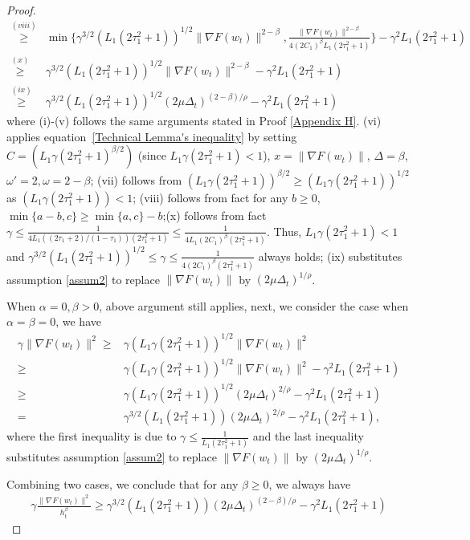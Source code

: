 \documentclass[10pt]{article} %
\def\eqref#1{equation~\ref{#1}}
\newtheorem{proof}{Proof}
\begin{document}
\begin{proof}
\begin{align}
    \overset{(viii)}{\geq}& \min\{\gamma^{{3}/{2}} (L_1(2\tau_1^2+1))^{1/2}\|\nabla F(w_t) \|^{2-\beta},\frac{\big \|\nabla F(w_t) \big \|^{2-\beta}}{4(2C_1)^{\beta} L_1(2\tau_1^2+1)}\}-\gamma^2L_1(2\tau_1^2+1)\nonumber \\
    \overset{(x)}{\geq}&\gamma^{{3}/{2}} (L_1(2\tau_1^2+1))^{1/2}\|\nabla F(w_t) \|^{2-\beta}-\gamma^2L_1(2\tau_1^2+1)
    \nonumber\\
    \overset{(ix)}{\geq}&\gamma^{{3}/{2}} (L_1(2\tau_1^2+1))^{1/2}(2\mu \Delta_t)^{(2-\beta)/\rho}-\gamma^2L_1(2\tau_1^2+1)
\end{align}
where (i)-(v) follows the same arguments stated in Proof \ref{Appendix H}. (vi) applies \eqref{Technical Lemma's inequality} by setting $C=(L_1\gamma(2\tau_1^2+1)^{\beta/2})$ (since $L_1\gamma(2\tau_1^2+1)<1$), $x=\|\nabla F(w_t) \|$, $\Delta=\beta$, $\omega' = 2,\omega = 2-\beta$; (vii) follows from $(L_1\gamma(2\tau_1^2+1))^{\beta/2}\geq (L_1\gamma(2\tau_1^2+1))^{1/2}$ as $(L_1\gamma(2\tau_1^2+1))<1$; (viii) follows from fact for any $b\geq 0$, $\min \{a-b,c\}\geq \min\{a,c\}-b$;(x) follows from fact $\gamma \leq \frac{1}{4L_1((2\tau_1+2)/(1-\tau_1))(2\tau_1^2+1)}\leq \frac{1}{4L_1(2C_1)^{\beta}(2\tau_1^2+1)}$. Thus, $L_1\gamma(2\tau_1^2+1)<1$ and $\gamma^{3/2}(L_1(2\tau_1^2+1))^{1/2}\leq \gamma\leq  \frac{1}{4(2C_1)^{\beta}(2\tau_1^2+1)}$ always holds; (ix) substitutes assumption \ref{assum2} to replace $\|\nabla F(w_t) \|$ by $(2\mu\Delta_t)^{1/\rho}$.

When $\alpha=0,\beta>0$, above argument still applies, next, we consider the case when $\alpha=\beta=0$, we have
\begin{align}
    \gamma \|\nabla F(w_t) \|^2\geq& \gamma(L_1\gamma(2\tau_1^2+1))^{1/2} \|\nabla F(w_t) \|^2 \nonumber\\
    \geq & \gamma (L_1\gamma(2\tau_1^2+1))^{1/2}\|\nabla F(w_t) \|^2 - \gamma^2 L_1(2\tau_1^2+1)\nonumber \\
    \geq &\gamma (L_1\gamma(2\tau_1^2+1))^{1/2}(2\mu\Delta_t)^{2/\rho} - \gamma^2 L_1(2\tau_1^2+1)\nonumber\\
    = & \gamma^{3/2}(L_1(2\tau_1^2+1))(2\mu\Delta_t)^{2/\rho}-\gamma^2 L_1(2\tau_1^2+1),
\end{align}
where the first inequality is due to $\gamma\leq \frac{1}{L_1(2\tau_1^2+1)}$ and the last inequality substitutes assumption \ref{assum2} to replace $\|\nabla F(w_t) \|$ by $(2\mu\Delta_t)^{1/\rho}$.

Combining two cases, we conclude that for any $\beta\geq 0$, we always have
\begin{align}
    \gamma\frac{ \big \| \nabla F(w_t) \big \|^2}{h_t^{\beta}}\geq \gamma^{3/2}(L_1(2\tau_1^2+1))(2\mu\Delta_t)^{(2-\beta)/\rho}-\gamma^2 L_1(2\tau_1^2+1)
    \label{LHS stochastic PL}
\end{align}


\end{proof}
\end{document}
